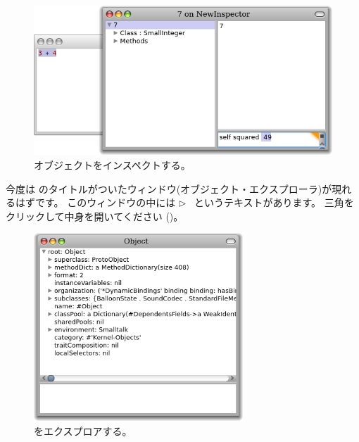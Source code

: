 \documentclass[a4paper,10pt,twoside]{book}
\begin{document}
\begin{figure}[htb]
\centerline {\includegraphics[width=\textwidth]{InspectIt}}
\caption{オブジェクトをインスペクトする。}
\end{figure}



今度は  のタイトルがついたウィンドウ(オブジェクト・エクスプローラ)が現れるはずです。
このウィンドウの中には \mbox{$\triangleright$ } というテキストがあります。
三角をクリックして中身を開いてください ()。

\begin{figure}[htb]
\centerline {\includegraphics[width=0.7\textwidth]{ExploreIt}}
\caption{ をエクスプロアする。}
\end{figure}
\end{document}
